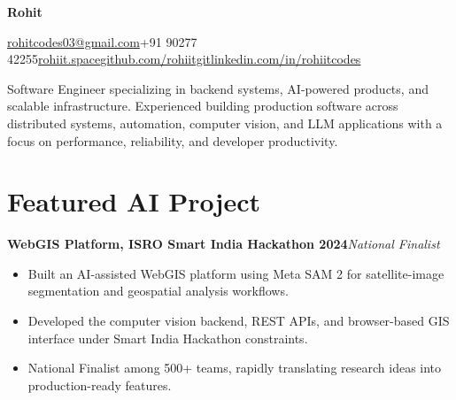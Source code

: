 \documentclass[10pt,a4paper]{article}
\newcommand{\entry}[2]{\textbf{#1}\hfill\textit{#2}\par}
\newcommand{\sep}{\enspace{\color{black!40}|}\enspace}
\begin{document}
\small
\begin{center}
{\Large\bfseries Rohit}\par\vspace{2pt}
\href{mailto:rohitcodes03@gmail.com}{rohitcodes03@gmail.com}\sep +91 90277 42255\sep \href{https://rohiit.space}{rohiit.space}\sep \href{https://github.com/rohiitgit}{github.com/rohiitgit}\sep \href{https://linkedin.com/in/rohiitcodes}{linkedin.com/in/rohiitcodes}
\end{center}
\vspace{-4pt}
Software Engineer specializing in backend systems, AI-powered products, and scalable infrastructure. Experienced building production software across distributed systems, automation, computer vision, and LLM applications with a focus on performance, reliability, and developer productivity.

\section*{Featured AI Project}
\entry{WebGIS Platform, ISRO Smart India Hackathon 2024}{National Finalist}
\begin{itemize}
\item Built an AI-assisted WebGIS platform using Meta SAM 2 for satellite-image segmentation and geospatial analysis workflows.
\item Developed the computer vision backend, REST APIs, and browser-based GIS interface under Smart India Hackathon constraints.
\item National Finalist among 500+ teams, rapidly translating research ideas into production-ready features.
\end{itemize}
\end{document}
